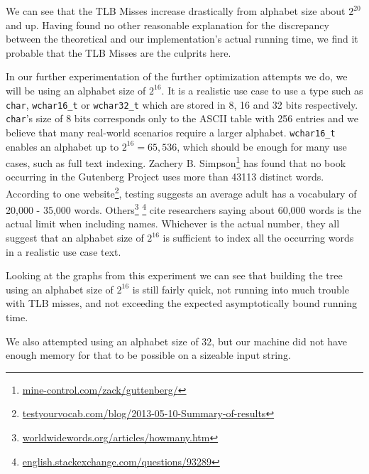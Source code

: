 We can see that the TLB Misses increase drastically from alphabet size about $2^{20}$ and up.
Having found no other reasonable explanation for the discrepancy between the theoretical and our implementation's actual running time, we find it probable that the TLB Misses are the culprits here.

In our further experimentation of the further optimization attempts we do, we will be using an alphabet size of $2^{16}$.
It is a realistic use case to use a type such as \texttt{char}, \texttt{wchar16\_t} or \texttt{wchar32\_t} which are stored in 8, 16 and 32 bits respectively.
\texttt{char}'s size of 8 bits corresponds only to the ASCII table with 256 entries and we believe that many real-world scenarios require a larger alphabet.
\texttt{wchar16\_t} enables an alphabet up to $2^{16} = 65,536$, which should be enough for many use cases, such as full text indexing.
Zachery B. Simpson\footnote{\url{mine-control.com/zack/guttenberg/}} has found that no book occurring in the Gutenberg Project uses more than 43113 distinct words.
According to one website\footnote{\url{testyourvocab.com/blog/2013-05-10-Summary-of-results}}, testing suggests an average adult has a vocabulary of 20,000 - 35,000 words. 
Others\footnote{\url{worldwidewords.org/articles/howmany.htm}} \footnote{\url{english.stackexchange.com/questions/93289}} cite researchers saying about 60,000 words is the actual limit when including names.
Whichever is the actual number, they all suggest that an alphabet size of $2^{16}$ is sufficient to index all the occurring words in a realistic use case text.

Looking at the graphs from this experiment we can see that building the tree using an alphabet size of $2^{16}$ is still fairly quick, not running into much trouble with TLB misses, and not exceeding the expected asymptotically bound running time.

We also attempted using an alphabet size of 32, but our machine did not have enough memory for that to be possible on a sizeable input string.



